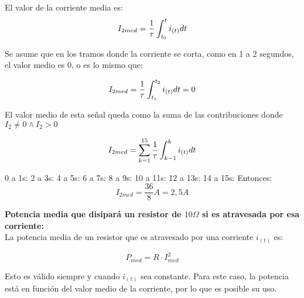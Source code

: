 \sangria{} El valor de la corriente media es:
{\Large \[ I_{2med} = \frac{1}{\tau} \int_{t_0}^t i_{(t)}dt \]}

Se asume que en los tramos donde la corriente se corta, como en 1 a 2 segundos, el valor medio es 0, o es lo mismo que:

{ \[ I_{2med} = \frac{1}{\tau} \int_{t_1}^{t_2} i_{(t)}dt = 0 \]}

El valor medio de esta señal queda como la suma de las contribuciones donde $I_2 \neq 0 \wedge I_2 > 0$

{\Large \[ I_{2med} = \sum_{k = 1}^{15}\frac{1}{\tau}\int_{k-1}^k i_{(t)} dt \]}

0 a 1s:
2 a 3s:
4 a 5s:
6 a 7s:
8 a 9s:
10 a 11s:
12 a 13s:
14 a 15s:
Entonces:
\[
I_{2med} = \frac{36}{8}A = 2,5A 
\]

\newpage

\textbf{Potencia media que disipará un resistor de $10\Omega$ si es atravesada por esa corriente:} \\

La potencia media de un resistor que es atravesado por una corriente $i_(t)$ es:
\begin{center}\Large
\[
    P_{med} = R \cdot I^2_{med}
\]
\end{center}
Esto es válido siempre y cuando $i_{(t)}$ sea constante. Para este caso, la potencia está en función del valor medio de la corriente, por lo que es posible su uso.
